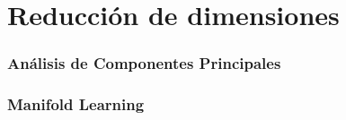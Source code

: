\section{Reducción de dimensiones}\label{sec:dimensionalityReduction}

\begin{frame}
    \frametitle{Análisis de Componentes Principales}

\end{frame}

\begin{frame}
    \frametitle{Manifold Learning}

\end{frame}